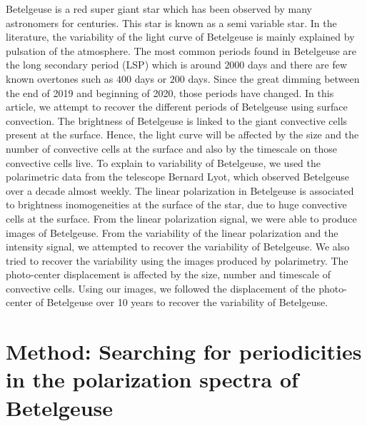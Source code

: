\documentclass{aa}
\begin{document}
Betelgeuse is a red super giant star which has been observed by many astronomers for centuries. This star is known as a 
semi variable star. In the literature, the variability of the light curve of Betelgeuse is mainly explained by pulsation of 
the atmosphere. The most common periods found in Betelgeuse are the long secondary period (LSP) which is around $2000$ days 
and there are few known overtones such as $400$ days or $200$ days. Since the great dimming between the end of 2019 and 
beginning of 2020, those periods have changed. In this article, we attempt to recover the different periods of Betelgeuse 
using surface convection. The brightness of Betelgeuse is linked to the giant convective cells present at the surface. Hence, 
the light curve will be affected by the size and the number of convective cells at the surface and also by the timescale on 
those convective cells live. To explain to variability of Betelgeuse, we used the polarimetric data from the telescope Bernard 
Lyot, which observed Betelgeuse over a decade almost weekly. The linear polarization in Betelgeuse is associated to brightness 
inomogeneities at the surface of the star, due to huge convective cells at the surface. From the linear polarization signal, 
we were able to produce images of Betelgeuse. From the variability of the linear polarization and the intensity signal, we 
attempted to recover the variability of Betelgeuse. We also tried to recover the variability using the images produced by 
polarimetry. The photo-center displacement is affected by the size, number and timescale of convective cells. Using our 
images, we followed the displacement of the photo-center of Betelgeuse over 10 years to recover the variability of 
Betelgeuse. 

\section{Method: Searching for periodicities in the polarization spectra of Betelgeuse}
\end{document}
